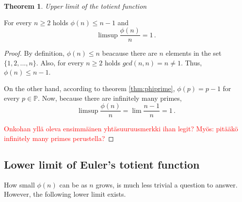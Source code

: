 \documentclass{article}
\theoremstyle{definition}
\newtheorem{theorem}[subsubsection]{Theorem}
\begin{document}
\begin{theorem}{\emph{Upper limit of the totient function}}

For every $n \geq 2$ holds $\phi(n) \leq n-1$ and
\begin{equation*}
    \limsup{\frac{\phi(n)}{n}} = 1\,.
\end{equation*}

\begin{proof}

By definition, $\phi(n) \leq n$ beacause there are $n$ elements in the set $\{1,2,...,n\}$. Also, for every $n \geq 2$ holds $gcd(n,n) = n \neq 1$. Thus, $\phi(n) \leq n-1$.

On the other hand, according to theorem \ref{thm:phiprime}, $\phi(p) = p-1$ for every $p\in\mathbb{P}$.
Now, because there are infinitely many primes,
\begin{equation*}
    \limsup{\frac{\phi(n)}{n}} = \lim \frac{n-1}{n} = 1\,.
\end{equation*}

\textcolor{red}{Onkohan yllä oleva ensimmäinen yhtäsuuruusmerkki ihan legit? Myös: pitääkö infinitely many primes perustella?}

\end{proof}

\end{theorem}

\subsection{Lower limit of Euler's totient function}

How small $\phi(n)$ can be as $n$ grows, is much less trivial a question to answer. However, the following lower limit exists.
\end{document}
